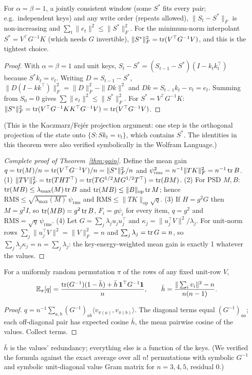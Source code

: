 \begin{theorem}\label{thm:surprise}
For $\alpha=\beta=1$, a jointly consistent window (some $S^\ast$ fits every pair; e.g.\ independent keys) and any write order (repeats allowed), $\|S_t-S^\ast\|_F$ is non-increasing and $\sum_t\|e_t\|^2\le\|S^\ast\|_F^2$. For the minimum-norm interpolant $S^\ast=V^\top G^{-1}K$ (which needs $G$ invertible), $\|S^\ast\|_F^2=\operatorname{tr}(V^\top G^{-1}V)$, and this is the tightest choice.
\end{theorem}
\begin{proof}
With $\alpha=\beta=1$ and unit keys, $S_t-S^\ast=(S_{t-1}-S^\ast)(I-k_tk_t^\top)$ because $S^\ast k_t=v_t$. Writing $D=S_{t-1}-S^\ast$, $\|D(I-kk^\top)\|_F^2=\|D\|_F^2-\|Dk\|^2$ and $Dk=S_{t-1}k_t-v_t=e_t$. Summing from $S_0=0$ gives $\sum\|e_t\|^2\le\|S^\ast\|_F^2$. For $S^\ast=V^\top G^{-1}K$: $\|S^\ast\|_F^2=\operatorname{tr}(V^\top G^{-1}KK^\top G^{-1}V)=\operatorname{tr}(V^\top G^{-1}V)$.
\end{proof}
(This is the Kaczmarz/Fej\'er projection argument: one step is the orthogonal projection of the state onto $\{S:Sk_t=v_t\}$, which contains $S^\ast$. The identities in this theorem were also verified symbolically in the Wolfram Language.)

\begin{proof}[Complete proof of Theorem~\ref{thm:gain}]
Define the mean gain $q=\operatorname{tr}(M)/n=\operatorname{tr}(V^\top G^{-1}V)/n=\|S^\ast\|_F^2/n$ and $\psi_{\mathrm{rms}}^2=n^{-1}\|TK\|_F^2=n^{-1}\operatorname{tr} B$. (1) $\|TV\|_F^2=\operatorname{tr}(THT^\top)=\operatorname{tr}(T G^{1/2}MG^{1/2}T^\top)=\operatorname{tr}(BM)$. (2) For PSD $M,B$: $\operatorname{tr}(MB)\le\lambda_{\max}(M)\operatorname{tr} B$ and $\operatorname{tr}(MB)\le\|B\|_{\mathrm{op}}\operatorname{tr} M$; hence $\mathrm{RMS}\le\sqrt{\lambda_{\max}(M)}\,\psi_{\mathrm{rms}}$ and $\mathrm{RMS}\le\|TK\|_{\mathrm{op}}\sqrt q$. (3) If $H=g^2G$ then $M=g^2I$, so $\operatorname{tr}(MB)=g^2\operatorname{tr} B$, $F_i=g\psi_i$ for every item, $q=g^2$ and $\mathrm{RMS}=\sqrt q\,\psi_{\mathrm{rms}}$. (4) Let $G=\sum_j\lambda_ju_ju_j^\top$ and $\kappa_j=\|u_j^\top V\|^2/\lambda_j$. For unit-norm rows $\sum_j\|u_j^\top V\|^2=\|V\|_F^2=n$ and $\sum_j\lambda_j=\operatorname{tr} G=n$, so $\sum_j\lambda_j\kappa_j=n=\sum_j\lambda_j$: the key-energy-weighted mean gain is exactly 1 whatever the values.
\end{proof}

\begin{proposition}\label{prop:expq}
For a uniformly random permutation $\pi$ of the rows of any fixed unit-row $V$,
\[
\mathbb{E}_\pi[q]=\frac{\operatorname{tr}(G^{-1})(1-\bar h)+\bar h\,\mathbf 1^\top G^{-1}\mathbf 1}{n},\qquad \bar h=\frac{\|\sum_iv_i\|^2-n}{n(n-1)}.
\]
\end{proposition}
\begin{proof}
$q=n^{-1}\sum_{a,b}(G^{-1})_{ab}\langle v_{\pi(a)},v_{\pi(b)}\rangle$. The diagonal terms equal $(G^{-1})_{aa}$; each off-diagonal pair has expected cosine $\bar h$, the mean pairwise cosine of the values. Collect terms.
\end{proof}
$\bar h$ is the values' redundancy; everything else is a function of the keys. (We verified the formula against the exact average over all $n!$ permutations with symbolic $G^{-1}$ and symbolic unit-diagonal value Gram matrix for $n=3,4,5$, residual $0$.)

